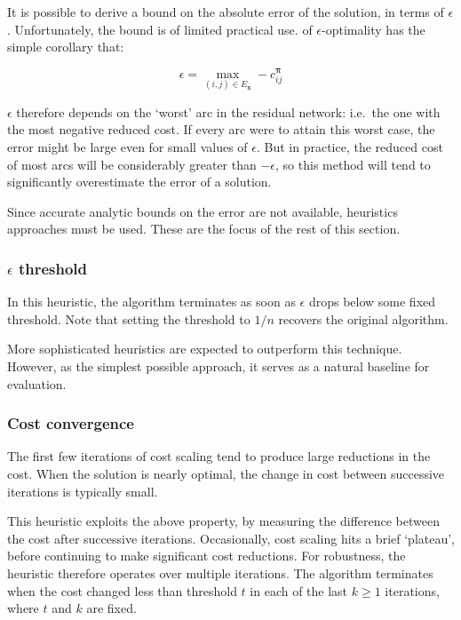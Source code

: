 It is possible to derive a bound on the absolute error of the solution, in terms of $\epsilon$. Unfortunately, the bound is of limited practical use.  of $\epsilon$-optimality has the simple corollary that:

\[\epsilon = \max_{(i,j) \in E_\mathbf{x}} -c_{ij}^{\boldsymbol{\pi}}\]

$\epsilon$ therefore depends on the `worst' arc in the residual network: i.e.\ the one with the most negative reduced cost. If every arc were to attain this worst case, the error might be large even for small values of $\epsilon$. But in practice, the reduced cost of most arcs will be considerably greater than $-\epsilon$, so this method will tend to significantly overestimate the error of a solution.

Since accurate analytic bounds on the error are not available, heuristics approaches must be used. These are the focus of the rest of this section.

\subsubsection{$\epsilon$ threshold}

In this heuristic, the algorithm terminates as soon as $\epsilon$ drops below some fixed threshold. Note that setting the threshold to $1/n$ recovers the original algorithm.

More sophisticated heuristics are expected to outperform this technique. However, as the simplest possible approach, it serves as a natural baseline for evaluation.

\subsubsection{Cost convergence}

The first few iterations of cost scaling tend to produce large reductions in the cost. When the solution is nearly optimal, the change in cost between successive iterations is typically small.

This heuristic exploits the above property, by measuring the difference between the cost after successive iterations. Occasionally, cost scaling hits a brief `plateau', before continuing to make significant cost reductions. For robustness, the heuristic therefore operates over multiple iterations. The algorithm terminates when the cost changed less than threshold $t$ in each of the last $k \geq 1$ iterations, where $t$ and $k$ are fixed.

